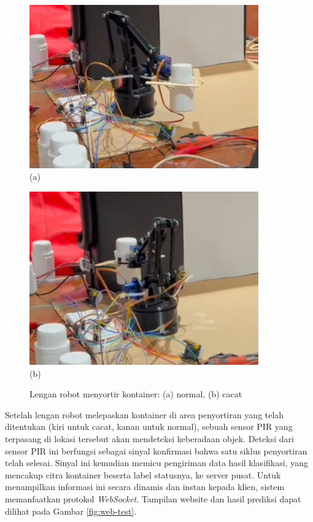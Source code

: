 \begin{figure}[H]
  \centering
  \begin{minipage}{\textwidth}
    \centering
    \includegraphics[width=0.88\textwidth]{gambar/robot_normal.jpeg}\\
    (a)
  \end{minipage}
  \vspace{1em}

  \begin{minipage}{\textwidth}
    \centering
    \includegraphics[width=0.88\textwidth]{gambar/robot_cacat.jpeg}\\
    (b)
  \end{minipage}
  \caption{Lengan robot menyortir kontainer: (a) normal, (b) cacat}
  \label{fig:robot-only}
  \vspace{-1em}
\end{figure}

Setelah lengan robot melepaskan kontainer di area penyortiran yang
telah ditentukan (kiri untuk cacat, kanan untuk normal), sebuah
sensor PIR yang terpasang di lokasi tersebut akan
mendeteksi keberadaan objek. Deteksi dari sensor PIR ini berfungsi
sebagai sinyal konfirmasi bahwa satu siklus penyortiran telah
selesai. Sinyal ini kemudian memicu pengiriman data hasil
klasifikasi, yang mencakup citra kontainer beserta label statusnya,
ke server pusat. Untuk menampilkan informasi ini secara dinamis dan
instan kepada klien, sistem memanfaatkan protokol \textit{WebSocket}.
Tampilan website dan hasil prediksi dapat dilihat pada Gambar
\ref{fig:web-test}.


